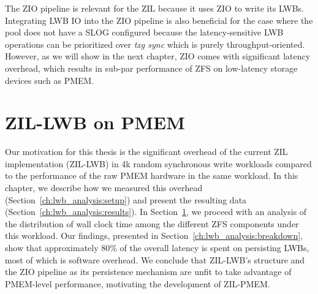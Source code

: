 \documentclass[12pt,a4paper,twoside]{book}
\begin{document}
{The ZIO pipeline is relevant for the ZIL because it uses ZIO to write its LWBs.
Integrating LWB IO into the ZIO pipeline is also beneficial for the case where the pool does not have a SLOG configured because the latency-sensitive LWB operations can be prioritized over \textit{txg sync} which is purely throughput-oriented.
However, as we will show in the next chapter, ZIO comes with significant latency overhead, which results in sub-par performance of ZFS on low-latency storage devices such as PMEM.

\chapter{ZIL-LWB on PMEM}\label{ch:lwb_analysis}
Our motivation for this thesis is the significant overhead of the current ZIL implementation (ZIL-LWB) in 4k random synchronous write workloads compared to the performance of the raw PMEM hardware in the same workload.
In this chapter, we describe how we measured this overhead (Section~\ref{ch:lwb_analysis:setup}) and present the resulting data (Section~\ref{ch:lwb_analysis:results}).
In Section~\ref{ch:lwb_analysis}, we proceed with an analysis of the distribution of wall clock time among the different ZFS components under this workload.
Our findings, presented in Section~\ref{ch:lwb_analysis:breakdown}, show that approximately 80\% of the overall latency is spent on persisting LWBs, most of which is software overhead.
We conclude that ZIL-LWB's structure and the ZIO pipeline as its persistence mechanism are unfit to take advantage of PMEM-level performance, motivating the development of ZIL-PMEM.

}
\end{document}
